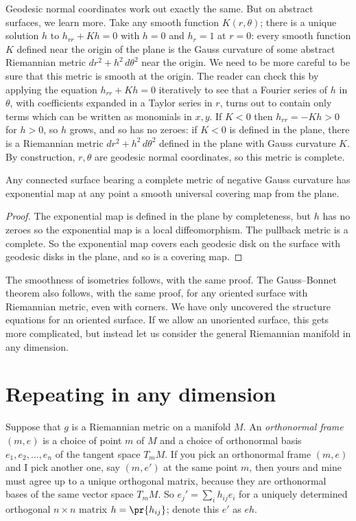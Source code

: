 Geodesic normal coordinates work out exactly the same.
But on abstract surfaces, we learn more.
Take any smooth function \(K(r,\theta)\); there is a unique solution \(h\) to \(h_{rr}+Kh=0\) with \(h=0\) and \(h_r=1\) at \(r=0\): every smooth function \(K\) defined near the origin of the plane is the Gauss curvature of some abstract Riemannian metric \(dr^2 + h^2 \, d\theta^2\) near the origin.
We need to be more careful to be sure that this metric is smooth at the origin.
The reader can check this by applying the equation \(h_{rr}+Kh=0\) iteratively to see that a Fourier series of  \(h\) in \(\theta\), with coefficients expanded in a Taylor series in \(r\), turns out to contain only terms which can be written as monomials in \(x,y\).
If \(K<0\) then \(h_{rr}=-Kh>0\) for \(h>0\), so \(h\) grows, and so has no zeroes: if \(K<0\) is defined in the plane, there is a Riemannian metric \(dr^2+h^2 \, d\theta^2\) defined in the plane with Gauss curvature \(K\).
By construction, \(r,\theta\) are geodesic normal coordinates, so this metric is complete.
\begin{theorem}
Any connected surface bearing a complete metric of negative Gauss curvature has exponential map at any point a smooth universal covering map from the plane.
\end{theorem}
\begin{proof}
The exponential map is defined in the plane by completeness, but \(h\) has no zeroes so the exponential map is a local diffeomorphism.
The pullback metric is a complete.
So the exponential map covers each geodesic disk on the surface with geodesic disks in the plane, and so is a covering map.
\end{proof}

The smoothness of isometries follows, with the same proof.
The Gauss--Bonnet theorem also follows, with the same proof, for any oriented surface with Riemannian metric, even with corners.
We have only uncovered the structure equations for an oriented surface.
If we allow an unoriented surface, this gets more complicated, but instead let us consider the general Riemannian manifold in any dimension.

\section{Repeating in any dimension}
Suppose that \(g\) is a Riemannian metric on a manifold \(M\).
An \emph{orthonormal frame}  \((m,e)\) is a choice of point \(m\) of \(M\) and a choice of orthonormal basis \(e_1, e_2, \dots, e_n\) of the tangent space \(T_m M\).
If you pick an orthonormal frame \((m,e)\) and I pick another one, say \((m,e')\) at the same point \(m\), then yours and mine must agree up to a unique orthogonal matrix, because they are orthonormal bases of the same vector space \(T_m M\).
So \(e_j' = \sum_i h_{ij} e_i\) for a uniquely determined orthogonal \(n \times n\) matrix \(h=\pr{h_{ij}}\); denote this \(e'\) as \(eh\).

